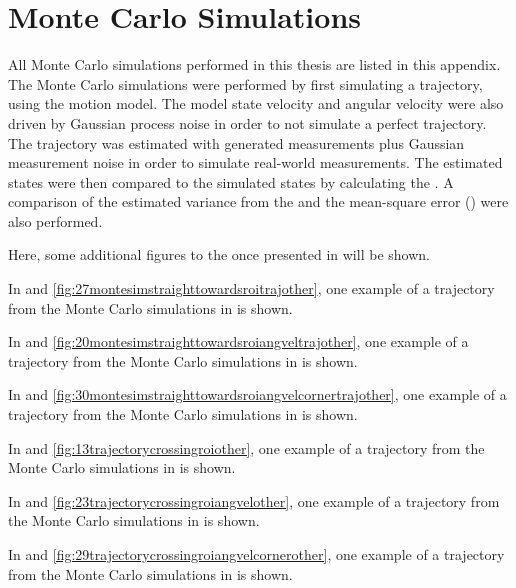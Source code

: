 \chapter{Monte Carlo Simulations}
\label{app:montecarlo}

All Monte Carlo simulations performed in this thesis are listed in this appendix.
The Monte Carlo simulations were performed by first simulating a trajectory, using the motion model.
The model state velocity and angular velocity were also driven by Gaussian process noise in order to not simulate a perfect trajectory.
The trajectory was estimated with generated measurements plus Gaussian measurement noise in order to simulate real-world measurements.
The estimated states were then compared to the simulated states by calculating the \abbrRMSE.
A comparison of the estimated variance from the \abbrEKF and the mean-square error (\abbrMSE) were also performed.

Here, some additional figures to the once presented in  will be shown.

In  and \ref{fig:27montesimstraighttowardsroitrajother}, one example of a trajectory from the Monte Carlo simulations in  is shown.

In  and \ref{fig:20montesimstraighttowardsroiangveltrajother}, one example of a trajectory from the Monte Carlo simulations in  is shown.

In  and \ref{fig:30montesimstraighttowardsroiangvelcornertrajother}, one example of a trajectory from the Monte Carlo simulations in  is shown.

In  and \ref{fig:13trajectorycrossingroiother}, one example of a trajectory from the Monte Carlo simulations in  is shown.

In  and \ref{fig:23trajectorycrossingroiangvelother}, one example of a trajectory from the Monte Carlo simulations in  is shown.

In  and \ref{fig:29trajectorycrossingroiangvelcornerother}, one example of a trajectory from the Monte Carlo simulations in  is shown.

